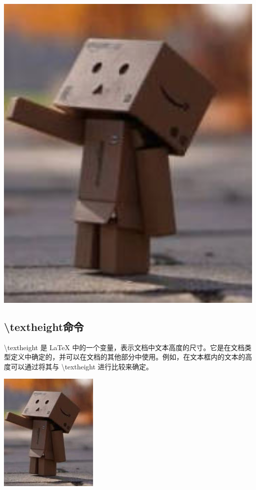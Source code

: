 \documentclass{article}
\begin{document}
	\includegraphics[width=1\textwidth]{test.jpg}
	
	\subsection{\textbackslash textheight命令}
	\textbackslash textheight 是 LaTeX 中的一个变量，表示文档中文本高度的尺寸。它是在文档类型定义中确定的，并可以在文档的其他部分中使用。例如，在文本框内的文本的高度可以通过将其与 \textbackslash textheight 进行比较来确定。
	
	\includegraphics[height=0.125\textheight]{test.jpg}
	
\end{document}

